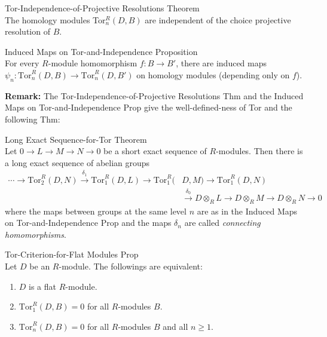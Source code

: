 \begin{theorem}{Tor-Independence-of-Projective Resolutions Theorem}\\
The homology modules Tor$_n^R (D,B)$ are independent of the choice projective resolution of $B$.
\end{theorem}

\begin{proposition}{Induced Maps on Tor-and-Independence Proposition}\\
For every $R$-module homomorphism $f:B\to B'$, there are induced maps $\psi_n: \text{Tor}_n^R (D,B) \to \text{Tor}_n^R (D,B')$ on homology modules (depending only on $f$).
\end{proposition}

\noindent\textbf{Remark:} The Tor-Independence-of-Projective Resolutions Thm and the Induced Maps on Tor-and-Independence Prop give the well-defined-ness of Tor and the following Thm:

\begin{theorem}{Long Exact Sequence-for-Tor Theorem}\\
Let $0\to L\to M\to N\to0$ be a short exact sequence of $R$-modules. Then there is a long exact sequence of abelian groups
\begin{align*}
    \cdots \to \text{Tor}_2^R (D,N) \xrightarrow{\delta_1} \text{Tor}_1^R (D,L) \to \text{Tor}_1^R (&D,M)
    \to \text{Tor}_1^R (D,N)\\
    &\xrightarrow{\delta_0} D\otimes_RL \to D\otimes_RM\to D\otimes_RN\to 0
\end{align*}
where the maps between groups at the same level $n$ are as in the Induced Maps on Tor-and-Independence Prop and the maps $\delta_n$ are called \textit{connecting homomorphisms}.
\end{theorem}


\begin{proposition}{Tor-Criterion-for-Flat Modules Prop}\\
Let $D$ be an $R$-module. The followings are equivalent:
\begin{enumerate}
    \item $D$ is a flat $R$-module.
    \item $\text{Tor}_1^R (D,B)=0$ for all $R$-modules $B$.
    \item $\text{Tor}_n^R (D,B)=0$ for all $R$-modules $B$ and all $n\geq 1$.
\end{enumerate}
\end{proposition}

